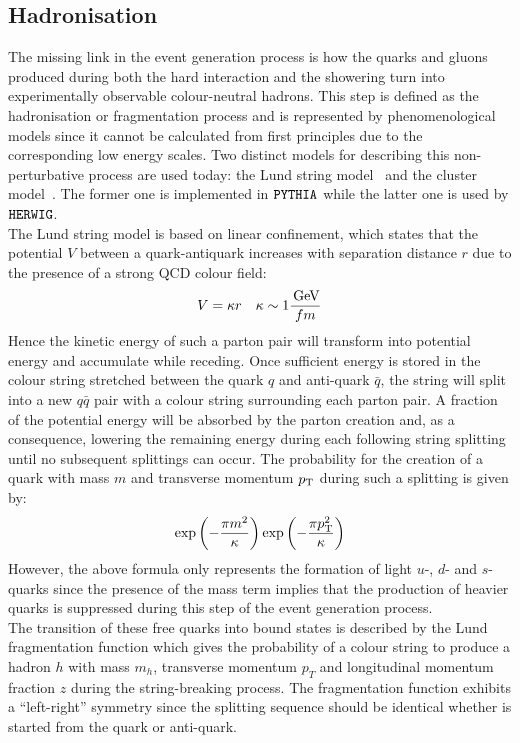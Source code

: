 \subsection{Hadronisation} \label{sec::Hadronisation}
The missing link in the event generation process is how the quarks and gluons produced during both the hard interaction and the showering turn into experimentally observable colour-neutral hadrons. This step is defined as the hadronisation or fragmentation process and is represented by phenomenological models since it cannot be calculated from first principles due to the corresponding low energy scales.
Two distinct models for describing this non-perturbative process are used today: the Lund string model~\cite{Lund} and the cluster model~\cite{ClusterModel}. The former one is implemented in $\texttt{PYTHIA}$ while the latter one is used by $\texttt{HERWIG}$.
\\
The Lund string model is based on linear confinement, which states that the potential $V$ between a quark-antiquark increases with separation distance $r$ due to the presence of a strong QCD colour field: %
\begin{equation}\label{eq::VQCD}
 V = \kappa r ~~~ \kappa \sim 1 \dfrac{\, \mathrm{GeV}}{fm}
\end{equation}
Hence the kinetic energy of such a parton pair will transform into potential energy and accumulate while receding. 
Once sufficient energy is stored in the colour string stretched between the quark $q$ and anti-quark $\bar{q}$, the string will split into a new $q\bar{q}$ pair with a colour string surrounding each parton pair.
A fraction of the potential energy will be absorbed by the parton creation and, as a consequence, lowering the remaining energy during each following string splitting until no subsequent splittings can occur.
The probability for the creation of a quark with mass $m$ and transverse momentum $p_{\rm T}$ during such a splitting is given by:
\begin{equation}\label{eq::mBot}
 \exp \left( -\frac{\pi m^{2}}{\kappa} \right) \exp \left(-\frac{\pi p_{\rm T}^{2}}{\kappa} \right)
\end{equation}
However, the above formula only represents the formation of light $u$-, $d$- and $s$-quarks since the presence of the mass term implies that the production of heavier quarks is suppressed during this step of the event generation process. 
\\
The transition of these free quarks into bound states is described by the Lund fragmentation function which gives the probability of a colour string to produce a hadron $h$ with mass $m_{h}$, transverse momentum $p_{T}$ and longitudinal momentum fraction $z$ during the string-breaking process. The fragmentation function exhibits a ``left-right'' symmetry since the splitting sequence should be identical whether is started from the quark or anti-quark.
